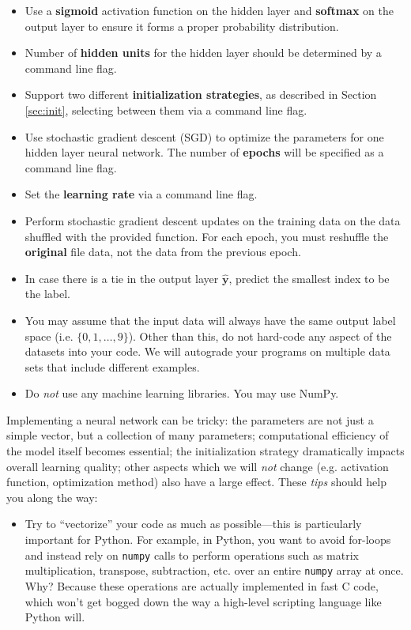 \documentclass[11pt,addpoints,answers]{exam}
\newcommand{\yv}{\mathbf{y}}
\begin{document}
\begin{itemize}
    \item Use a {\bf sigmoid} activation function on the hidden layer and {\bf softmax} on the  output layer to ensure it forms a proper probability distribution.
    \item Number of {\bf hidden units} for the hidden layer should be determined by a command line flag.
    \item Support two different {\bf initialization strategies}, as described in Section \ref{sec:init}, selecting between them via a command line flag.
    \item Use stochastic gradient descent (SGD) to optimize the parameters for one hidden layer neural network. The number of {\bf epochs} will be specified as a command line flag. 
    \item Set the {\bf learning rate} via a command line flag.
    \item Perform stochastic gradient descent updates on the training data on the data shuffled with the provided function. For each epoch, you must reshuffle the \textbf{original} file data, not the data from the previous epoch.
    \item In case there is a tie in the output layer $\hat{\yv}$, predict the smallest index to be the label.
    \item You may assume that the input data will always have the same output label space (i.e. $\{0,1,\ldots,9\}$). Other than this, do not hard-code any aspect of the datasets into your code. We will autograde your programs on multiple data sets that include different examples.
    \item Do \emph{not} use any machine learning libraries. You may use NumPy.
\end{itemize}

Implementing a neural network can be tricky: the parameters are not just a simple vector, but a collection of many parameters; computational efficiency of the model itself becomes essential; the initialization strategy dramatically impacts overall learning quality;  other aspects which we will \emph{not} change (e.g. activation function, optimization method) also have a large effect. These \emph{tips} should help you along the way:

\begin{itemize}
\item Try to ``vectorize'' your code as much as possible---this is particularly important for Python. For example, in Python, you want to avoid for-loops and instead rely on \lstinline{numpy} calls to perform operations such as matrix multiplication, transpose, subtraction, etc. over an entire \lstinline{numpy} array at once. Why? Because these operations are actually implemented in fast C code, which won't get bogged down the way a high-level scripting language like Python will.
\end{itemize}
\end{document}
